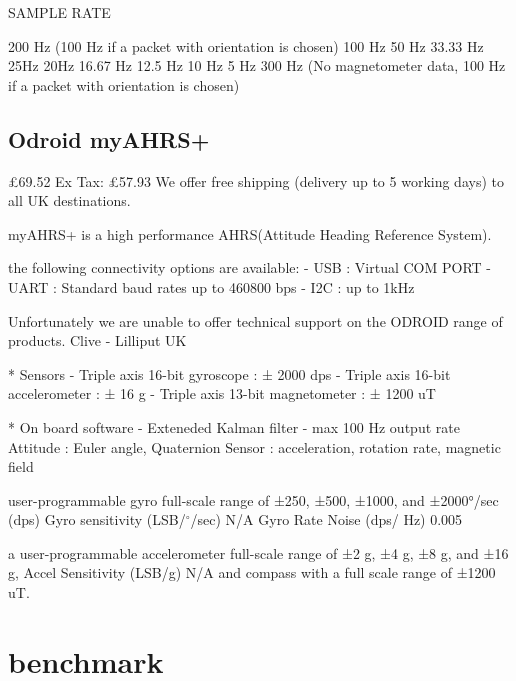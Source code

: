  SAMPLE RATE

 200 Hz (100 Hz if a packet with orientation is chosen)
 100 Hz
 50 Hz
 33.33 Hz
 25Hz
 20Hz
 16.67 Hz
 12.5 Hz
 10 Hz
  5 Hz
 300 Hz (No magnetometer data, 100 Hz if a packet with orientation
 is chosen)



 \subsection*{Odroid myAHRS+}

 £69.52
 Ex Tax: £57.93
  We offer free shipping (delivery up to 5 working days) to all UK destinations.

 myAHRS+ is a high performance AHRS(Attitude Heading Reference System).

 the following connectivity options are available:
    - USB : Virtual COM PORT
    - UART : Standard baud rates up to 460800 bps
    - I2C : up to 1kHz

  Unfortunately we are unable to offer technical support on the ODROID range of products.
 Clive - Lilliput UK

 * Sensors
    - Triple axis 16-bit gyroscope : ± 2000 dps
    - Triple axis 16-bit accelerometer : ± 16 g
    - Triple axis 13-bit magnetometer : ± 1200 uT

 * On board software
    - Exteneded Kalman filter
    - max 100 Hz output rate
           Attitude : Euler angle, Quaternion
           Sensor : acceleration, rotation rate, magnetic field


  user-programmable gyro full-scale range of ±250, ±500, ±1000, and ±2000°/sec (dps)
   Gyro sensitivity (LSB/$^{\circ}$/sec) N/A
 Gyro Rate Noise (dps/ Hz) 0.005

 a user-programmable accelerometer full-scale range of ±2 g, ±4 g, ±8 g, and ±16 g,
 Accel Sensitivity  (LSB/g) N/A
 and compass with a full scale range of ±1200 uT.






 \section{benchmark}


